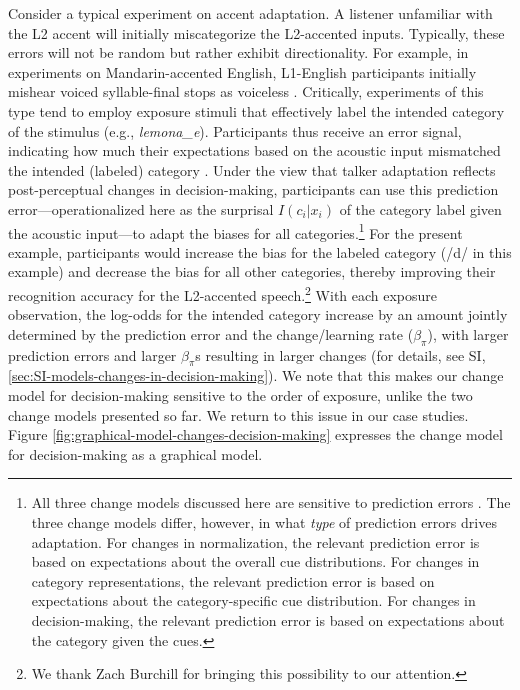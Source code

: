 \documentclass[
  11pt,
  man,floatsintext]{apa6}
\begin{document}
Consider a typical experiment on accent adaptation. A listener unfamiliar with the L2 accent will initially miscategorize the L2-accented inputs. Typically, these errors will not be random but rather exhibit directionality. For example, in experiments on Mandarin-accented English, L1-English participants initially mishear voiced syllable-final stops as voiceless \autocites[e.g., hearing \emph{lid} as \emph{lit},][]{flege1992,xie2016jep}. Critically, experiments of this type tend to employ exposure stimuli that effectively label the intended category of the stimulus (e.g., \emph{lemona\_e}). Participants thus receive an error signal, indicating how much their expectations based on the acoustic input mismatched the intended (labeled) category \autocite{olejarczuk2018}. Under the view that talker adaptation reflects post-perceptual changes in decision-making, participants can use this prediction error---operationalized here as the surprisal \(I(c_i|x_i)\) of the category label given the acoustic input---to adapt the biases for all categories.\footnote{All three change models discussed here are sensitive to prediction errors \autocite[e.g., for Bayesian belief-updating, sensitivity to the prediction error is a side-effect of optimal information integration, as demonstrated e.g., in][]{jaeger2019}. The three change models differ, however, in what \emph{type} of prediction errors drives adaptation. For changes in normalization, the relevant prediction error is based on expectations about the overall cue distributions. For changes in category representations, the relevant prediction error is based on expectations about the category-specific cue distribution. For changes in decision-making, the relevant prediction error is based on expectations about the category given the cues.} For the present example, participants would increase the bias for the labeled category (/d/ in this example) and decrease the bias for all other categories, thereby improving their recognition accuracy for the L2-accented speech.\footnote{We thank Zach Burchill for bringing this possibility to our attention.} With each exposure observation, the log-odds for the intended category increase by an amount jointly determined by the prediction error and the change/learning rate (\(\beta_{\pi}\)), with larger prediction errors and larger \(\beta_{\pi}\)s resulting in larger changes (for details, see SI, \ref{sec:SI-models-changes-in-decision-making}). We note that this makes our change model for decision-making sensitive to the order of exposure, unlike the two change models presented so far. We return to this issue in our case studies. Figure \ref{fig:graphical-model-changes-decision-making} expresses the change model for decision-making as a graphical model.
\end{document}
